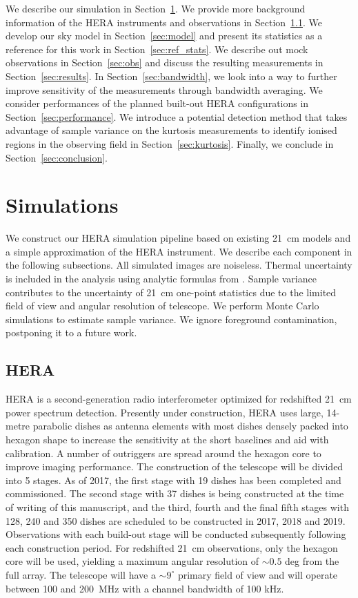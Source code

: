 \documentclass[fleqn,usenatbib]{mnras}
\begin{document}
We describe our simulation in Section~\ref{sec:sim}. We provide more background information of the HERA instruments and observations in Section~\ref{sec:hera}. We develop our sky model in Section~\ref{sec:model} and present its statistics as a reference for this work in Section~\ref{sec:ref_stats}. We describe out mock observations in Section~\ref{sec:obs} and discuss the resulting measurements in Section~\ref{sec:results}. In Section~\ref{sec:bandwidth}, we look into a way to further improve sensitivity of the measurements through bandwidth averaging. We consider performances of the planned built-out HERA configurations in Section~\ref{sec:performance}. We introduce a potential detection method that takes advantage of sample variance on the kurtosis measurements to identify ionised regions in the observing field in Section~\ref{sec:kurtosis}. Finally, we conclude in Section~\ref{sec:conclusion}.


\section{Simulations}
\label{sec:sim}

We construct our HERA simulation pipeline based on existing 21~cm models and a simple approximation of the HERA instrument. We describe each component in the following subsections. All simulated images are noiseless. Thermal uncertainty is included in the analysis using analytic formulas from \citet{Watkinson:2014jv}. Sample variance contributes to the uncertainty of 21~cm one-point statistics due to the limited field of view and angular resolution of telescope. We perform Monte Carlo simulations to estimate sample variance. We ignore foreground contamination, postponing it to a future work.

\subsection{HERA}
\label{sec:hera}
HERA is a second-generation radio interferometer optimized for redshifted 21~cm power spectrum detection. Presently under construction, HERA uses large, 14-metre parabolic dishes as antenna elements with most dishes densely packed into hexagon shape to increase the sensitivity at the short baselines and aid with calibration. A number of outriggers are spread around the hexagon core to improve imaging performance. The construction of the telescope will be divided into 5 stages. As of 2017, the first stage with 19 dishes has been completed and commissioned. The second stage with 37 dishes is being constructed at the time of writing of this manuscript, and the third, fourth and the final fifth stages with 128, 240 and 350 dishes are scheduled to be constructed in 2017, 2018 and 2019. Observations with each build-out stage will be conducted subsequently following each construction period. For redshifted 21~cm observations, only the hexagon core will be used, yielding a maximum angular resolution of $\sim0.5$ deg from the full array. The telescope will have a $\sim9^{\circ}$ primary field of view and will operate between 100 and 200~MHz with a channel bandwidth of 100 kHz.
\end{document}
